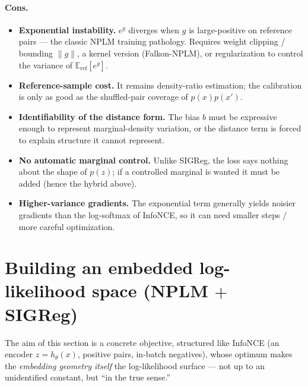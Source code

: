 \documentclass[11pt]{article}
\begin{document}
\paragraph{Cons.}
\begin{itemize}
\item \textbf{Exponential instability.} $e^{g}$ diverges when $g$ is
large-positive on reference pairs --- the classic NPLM training pathology.
Requires weight clipping / bounding $\|g\|$, a kernel version (Falkon-NPLM), or
regularization to control the variance of $\mathbb{E}_{\mathrm{ref}}[e^{g}]$.
\item \textbf{Reference-sample cost.} It remains density-ratio estimation; the
calibration is only as good as the shuffled-pair coverage of $p(x)p(x')$.
\item \textbf{Identifiability of the distance form.} The bias $b$ must be
expressive enough to represent marginal-density variation, or the distance term
is forced to explain structure it cannot represent.
\item \textbf{No automatic marginal control.} Unlike SIGReg, the loss says
nothing about the shape of $p(z)$; if a controlled marginal is wanted it must be
added (hence the hybrid above).
\item \textbf{Higher-variance gradients.} The exponential term generally yields
noisier gradients than the log-softmax of InfoNCE, so it can need smaller steps /
more careful optimization.
\end{itemize}

\section{Building an embedded log-likelihood space (NPLM $+$ SIGReg)}
The aim of this section is a concrete objective, structured like InfoNCE (an
encoder $z=h_\theta(x)$, positive pairs, in-batch negatives), whose optimum makes
the \emph{embedding geometry itself} the log-likelihood surface --- not up to an
unidentified constant, but ``in the true sense.''
\end{document}
